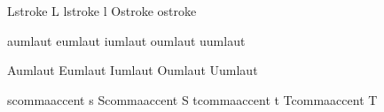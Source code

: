  Lstroke          {L}
 lstroke          {l}
 Ostroke          { } %
 ostroke          { } %

 aumlaut          {\moveaccent{-.1ex}\adiaeresis}
 eumlaut          {\moveaccent{-.1ex}\ediaeresis}
 iumlaut          {\moveaccent{-.1ex}\idiaeresis}
 oumlaut          {\moveaccent{-.1ex}\odiaeresis}
 uumlaut          {\moveaccent{-.1ex}\udiaeresis}

 Aumlaut          {\smashaccent\Adiaeresis}
 Eumlaut          {\smashaccent\Ediaeresis}
 Iumlaut          {\smashaccent\Idiaeresis}
 Oumlaut          {\smashaccent\Odiaeresis}
 Uumlaut          {\smashaccent\Udiaeresis}

 scommaaccent     {s\quoteright}
 Scommaaccent     {S\quoteright}
 tcommaaccent     {t\quoteright}
 Tcommaaccent     {T\quoteright}

\stopencoding


\def\eszett  {\ssharp}
\def\Eszett  {\Ssharp}

\def\lslash  {\lstroke}
\def\Lslash  {\Lstroke}
\def\dslash  {\dstroke}
\def\Dslash  {\Dstroke}
\def\oslash  {\ostroke}
\def\Oslash  {\Ostroke}


\def\S       {\sectionmark  }
\def\P       {\paragraphmark}


\def\textS   {\sectionmark  }
\def\textP   {\paragraphmark}


\def\florin  {\textflorin  }  \def\florijn{\textflorin}
\def\dollar  {\textdollar  }
\def\pound   {\textsterling}
\def\sterling{\textsterling}


\def\promille{\perthousand}
\def\permille{\perthousand}
\def\procent {\percent }
\def\permine {\fakepermine}


\def\hyphen  {\softhyphen}
\def\cwm     {\compoundwordmark}


\def\lowerleftsingleninequote  {\quotesinglebase}
\def\lowerleftdoubleninequote  {\quotedblbase}
\def\lowerrightsingleninequote {\quotesinglebase}
\def\lowerrightdoubleninequote {\quotedblbase}

